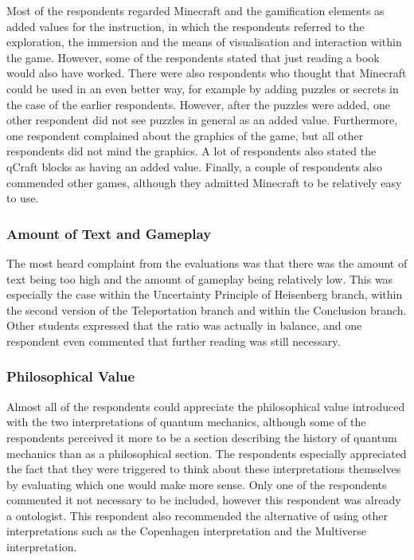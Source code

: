 \documentclass[11pt,twoside]{report} %
\begin{document}
Most of the respondents regarded Minecraft and the gamification elements as added values for the instruction, in which the respondents referred to the exploration, the immersion and the means of visualisation and interaction within the game. However, some of the respondents stated that just reading a book would also have worked. There were also respondents who thought that Minecraft could be used in an even better way, for example by adding puzzles or secrets in the case of the earlier respondents. However, after the puzzles were added, one other respondent did not see puzzles in general as an added value. Furthermore, one respondent complained about the graphics of the game, but all other respondents did not mind the graphics. A lot of respondents also stated the qCraft blocks as having an added value. Finally, a couple of respondents also commended other games, although they admitted Minecraft to be relatively easy to use.

\subsubsection{Amount of Text and Gameplay}

The most heard complaint from the evaluations was that there was the amount of text being too high and the amount of gameplay being relatively low. This was especially the case within the Uncertainty Principle of Heisenberg branch, within the second version of the Teleportation branch and within the Conclusion branch. Other students expressed that the ratio was actually in balance, and one respondent even commented that further reading was still necessary.

\subsubsection{Philosophical Value}

Almost all of the respondents could appreciate the philosophical value introduced with the two interpretations of quantum mechanics, although some of the respondents perceived it more to be a section describing the history of quantum mechanics than as a philosophical section. The respondents especially appreciated the fact that they were triggered to think about these interpretations themselves by evaluating which one would make more sense. Only one of the respondents commented it not necessary to be included, however this respondent was already a ontologist. This respondent also recommended the alternative of using other interpretations such as the Copenhagen interpretation and the Multiverse interpretation.
\end{document}
